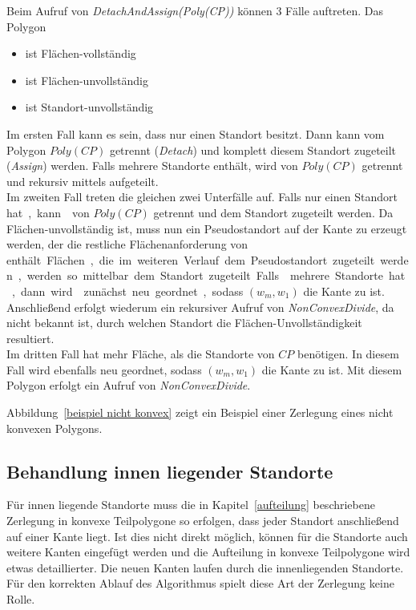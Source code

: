 \documentclass[ngerman]{seminarbeitrag}
\begin{document}
Beim Aufruf von \emph{DetachAndAssign(Poly(CP))} können 3 Fälle auftreten. Das Polygon
\begin{itemize}
\item {} ist Flächen-vollständig
\item {} ist Flächen-unvollständig
\item {} ist Standort-unvollständig
\end{itemize}
Im ersten Fall kann es sein, dass  nur einen Standort besitzt. Dann kann\linebreak {} vom Polygon $Poly(CP)$ getrennt (\emph{Detach}) und komplett diesem Standort zugeteilt (\emph{Assign}) werden.
Falls mehrere Standorte enthält, wird von $Poly(CP)$ getrennt und rekursiv mittels \noncon aufgeteilt. \\
Im zweiten Fall treten die gleichen zwei Unterfälle auf. Falls nur einen Standort \si hat, kann von $Poly(CP)$ getrennt und dem Standort zugeteilt werden. Da Flächen-unvollständig ist, muss nun ein Pseudostandort auf der Kante zu erzeugt werden, der die restliche Flächenanforderung von \si enthält. Flächen, die im weiteren Verlauf dem Pseudostandort zugeteilt werden, werden so mittelbar dem Standort \si zugeteilt.
Falls mehrere Standorte hat, dann wird zunächst neu geordnet, sodass $(w_{m}, w_{1})$ die Kante zu ist. Anschließend erfolgt wiederum ein rekursiver Aufruf von \mbox{\textit{NonConvexDivide}}, da nicht bekannt ist, durch welchen Standort die Flächen-Unvollständigkeit resultiert.\\
Im dritten Fall hat mehr Fläche, als die Standorte von $CP$ benötigen. In diesem Fall wird ebenfalls neu geordnet, sodass $(w_{m}, w_{1})$ die Kante zu  ist. Mit diesem Polygon erfolgt ein Aufruf von \mbox{\textit{NonConvexDivide}}.

Abbildung~\ref{beispiel nicht konvex} zeigt ein Beispiel einer Zerlegung eines nicht konvexen Polygons.

\subsection{Behandlung innen liegender Standorte}\label{innere Standorte}
Für innen liegende Standorte muss die in Kapitel~\ref{aufteilung} beschriebene Zerlegung in konvexe Teilpolygone so erfolgen, dass jeder Standort anschließend auf einer Kante liegt. Ist dies nicht direkt möglich, können für die Standorte auch weitere Kanten eingefügt werden und die Aufteilung in konvexe Teilpolygone wird etwas detaillierter. Die neuen Kanten laufen durch die innenliegenden Standorte. Für den korrekten Ablauf des Algorithmus spielt diese Art der Zerlegung keine Rolle.
\end{document}
